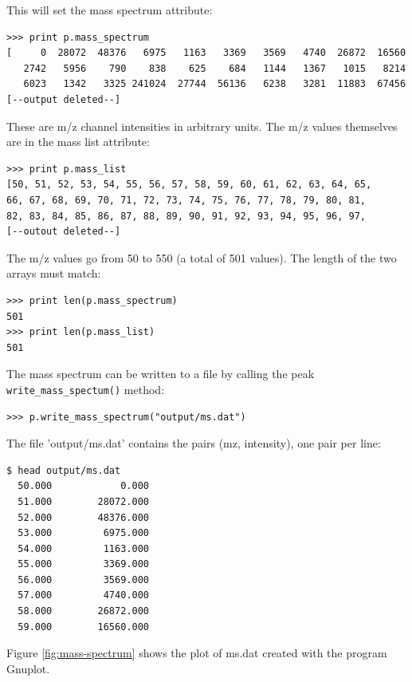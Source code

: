 \noindent
This will set the mass spectrum attribute:

\begin{verbatim}
>>> print p.mass_spectrum
[     0  28072  48376   6975   1163   3369   3569   4740  26872  16560
   2742   5956    790    838    625    684   1144   1367   1015   8214
   6023   1342   3325 241024  27744  56136   6238   3281  11883  67456
[--output deleted--]
\end{verbatim}

\noindent
These are m/z channel intensities in arbitrary units. The m/z values
themselves are in the mass list attribute:

\begin{verbatim}
>>> print p.mass_list
[50, 51, 52, 53, 54, 55, 56, 57, 58, 59, 60, 61, 62, 63, 64, 65,
66, 67, 68, 69, 70, 71, 72, 73, 74, 75, 76, 77, 78, 79, 80, 81,
82, 83, 84, 85, 86, 87, 88, 89, 90, 91, 92, 93, 94, 95, 96, 97,
[--outout deleted--]
\end{verbatim}

\noindent
The m/z values go from 50 to 550 (a total of 501 values).  The length of
the two arrays must match:

\begin{verbatim}
>>> print len(p.mass_spectrum)
501
>>> print len(p.mass_list)
501
\end{verbatim}

The mass spectrum can be written to a file by calling the peak
{\tt write\_mass\_spectum()} method:

\begin{verbatim}
>>> p.write_mass_spectrum("output/ms.dat")
\end{verbatim}

\noindent
The file 'output/ms.dat' contains the pairs (mz, intensity), one pair
per line:

\begin{verbatim}
$ head output/ms.dat
  50.000            0.000
  51.000        28072.000
  52.000        48376.000
  53.000         6975.000
  54.000         1163.000
  55.000         3369.000
  56.000         3569.000
  57.000         4740.000
  58.000        26872.000
  59.000        16560.000
\end{verbatim}

Figure \ref{fig:mass-spectrum} shows the plot of ms.dat created with the
program Gnuplot.

